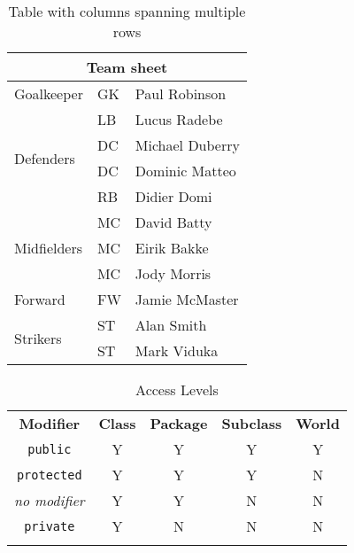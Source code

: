 \documentclass{article}
\newcommand*{\mylemon}{\cellcolor{LemonChiffon}}
\newcommand*{\myblue}{\cellcolor{SkyBlue}}
\newcommand*{\mythistle}{\cellcolor{Thistle}}
\begin{document}
\begin{table}
    \centering
    \caption{Table with columns spanning multiple rows}
    \begin{tabular}{|l|l|l|}
    \hline
    \multicolumn{3}{|c|}{Team sheet} \\
    \hline
    Goalkeeper & GK & Paul Robinson \\
    \hline
    \multirow{4}{*}{Defenders} & LB & Lucus Radebe \\
     & DC & Michael Duberry \\
     & DC & Dominic Matteo \\
     & RB & Didier Domi \\
     \hline
    \multirow{3}{*}{Midfielders} & MC & David Batty \\
     & MC & Eirik Bakke \\
     & MC & Jody Morris \\
     \hline
    Forward & FW & Jamie McMaster \\
    \hline
    \multirow{2}{*}{Strikers} & ST & Alan Smith \\
     & ST & Mark Viduka \\
    \hline
    \end{tabular}
\end{table}

\begin{table}[htb]
    \centering
    \sffamily
    \caption*{Access Levels}
    \begin{tabular}{||*{5}{c||}}
    \hhline{|t:=:t:=:t:=:t:=:t:=:t|}
    \rowcolor{blue!30}
    \bfseries Modifier               & \bfseries Class & \bfseries Package & \bfseries Subclass & \bfseries World \\ \hhline{|:=::=::=::=::=:|}
    \mythistle\texttt{public}          & \mylemon Y      & \mylemon Y        & \mylemon Y         & \mylemon Y      \\
    \hhline{|:=::=::=::=::=:|}
    \mythistle\texttt{protected}       & \mylemon Y      & \mylemon Y        & \mylemon Y         & \myblue N        \\
    \hhline{|:=::=::=::=::=:|}
    \mythistle\itshape no modifier     & \mylemon Y      & \mylemon Y        & \myblue N           & \myblue N        \\
    \hhline{|:=::=::=::=::=:|}
    \mythistle\texttt{private}         & \mylemon Y      & \myblue N         & \myblue N           & \myblue N        \\
    \hhline{|b:=:b:=:b:=:b:=:b:=:b|}
    \end{tabular}
\end{table}
\end{document}
